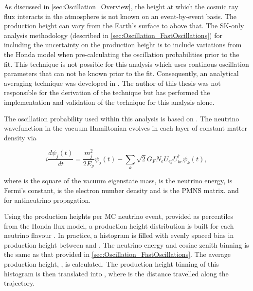 As discussed in \autoref{sec:Oscillation_Overview}, the height at which the cosmic ray flux interacts in the atmosphere is not known on an event-by-event basis. The production height can vary from the Earth's surface to  above that. The SK-only analysis methodology (described in \autoref{sec:Oscillation_FastOscillations}) for including the uncertainty on the production height is to include variations from the Honda model when pre-calculating the oscillation probabilities prior to the fit. This technique is not possible for this analysis which uses continous oscillation parameters that can not be known prior to the fit. Consequently, an analytical averaging technique was developed in \cite{t2k_tn_425}. The author of this thesis was not responsible for the derivation of the technique but has performed the implementation and validation of the technique for this analysis alone.

The oscillation probability used within this analysis is based on \cite{Barger:1980tf}. The neutrino wavefunction in the vacuum Hamiltonian evolves in each layer of constant matter density via

\begin{equation}
  i \frac{d\psi_{j}(t)}{dt} = \frac{m_{j}^{2}}{2E_{\nu}} \psi_{j}(t) - \sum_{k} \sqrt{2} G_{F} N_{e} U_{ej} U_{ke}^{\dagger} \psi_{k}(t),
\end{equation}

where  is the square of the  vacuum eigenstate mass,  is the neutrino energy,  is Fermi's constant,  is the electron number density and  is the PMNS matrix.  and  for antineutrino propagation.

Using the  production heights per MC neutrino event, provided as  percentiles from the Honda flux model, a production height distribution  is built for each neutrino flavour . In practice, a histogram is filled with  evenly spaced bins in production height  between  and . The neutrino energy and cosine zenith binning is the same as that provided in \autoref{sec:Oscillation_FastOscillations}. The average production height, , is calculated. The production height binning of this histogram is then translated into , where  is the distance travelled along the trajectory.

